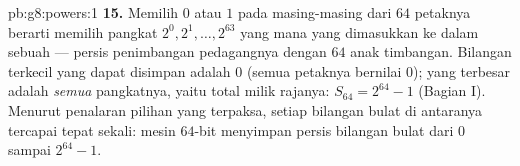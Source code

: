 \begin{solution}{pb:g8:powers:1}
\textbf{15.} Memilih $0$ atau $1$ pada masing-masing dari $64$
petaknya berarti memilih pangkat $2^0, 2^1, \dots, 2^{63}$ yang mana
yang dimasukkan ke dalam sebuah  --- persis penimbangan
pedagangnya dengan $64$ anak timbangan. Bilangan terkecil yang dapat
disimpan adalah $0$ (semua petaknya bernilai $0$); yang terbesar
adalah  \emph{semua} pangkatnya, yaitu total milik rajanya:
$S_{64} = 2^{64} - 1$ (Bagian I). Menurut penalaran pilihan yang
terpaksa, setiap bilangan bulat di antaranya tercapai tepat sekali:
mesin $64$-bit menyimpan persis bilangan bulat dari $0$ sampai
$2^{64} - 1$.

\end{solution}
